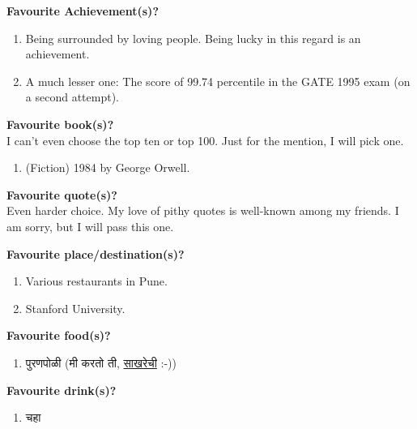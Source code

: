 \documentclass[17pt]{extarticle}  %
\begin{document}
\begin{enumerate}
\begin{english}
\item \textbf{Favourite Achievement(s)?}\\
\begin{enumerate}
\item Being surrounded by loving people. Being lucky in this regard is an achievement.
\item A much lesser one: The score of 99.74 percentile in the GATE 1995 exam (on a second attempt).
\end{enumerate}
\item \textbf{Favourite book(s)?}\\
I can't even choose the top ten or top 100. Just for the mention, I will pick one.
\begin{enumerate}
\item (Fiction) 1984 by George Orwell.
\end{enumerate}

\item \textbf{Favourite quote(s)?}\\
Even harder choice. My love of pithy quotes is well-known among my friends. I am sorry, but I will pass this one.

\item \textbf{Favourite place/destination(s)?}\\

\begin{enumerate}
\item Various restaurants in Pune.
\item Stanford University.
\end{enumerate}

\item\textbf{Favourite food(s)?}\\
\begin{enumerate}
\item \begin{marathi}पुरणपोळी (मी करतो ती, \href{https://github.com/kedarmhaswade/writings/blob/main/marathi/puraNa-poLii/saakharechii-puraNapoLii.pdf}{साखरेची} :-))\end{marathi}
\end{enumerate}

\item\textbf{Favourite drink(s)?}\\
\begin{enumerate}
\item \begin{marathi}चहा\end{marathi}
\end{enumerate}


\end{english}
\end{enumerate}
\end{document}

